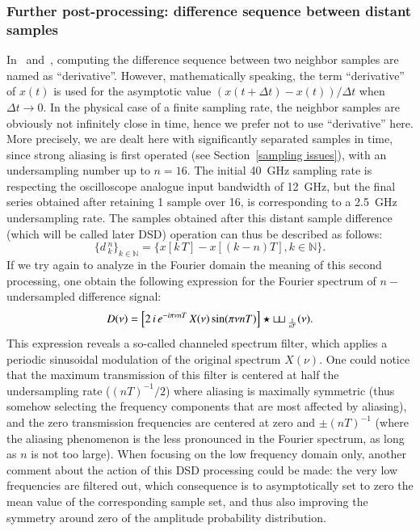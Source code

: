 \subsubsection{Further post-processing: difference sequence between
  distant samples}
\label{dsd}
%
In~\cite{ultrafast2009} and~\cite{ultrafast2010}, computing the
difference sequence between two neighbor samples are named as
``derivative''. However, mathematically speaking, the term
``derivative'' of $x(t)$ is used for the asymptotic value $(
x(t+\Delta t)-x(t) )/ \Delta t$ when $\Delta t\rightarrow 0$. In the
physical case of a finite sampling rate, the neighbor samples are
obviously not infinitely close in time, hence we prefer not to use
``derivative'' here. More precisely, we are dealt here with
significantly separated samples in time, since strong aliasing is
first operated (see Section~\ref{sampling issues}), with an
undersampling number up to $n=16$. The initial 40~GHz sampling rate is
respecting the oscilloscope analogue input bandwidth of 12~GHz, but
the final series obtained after retaining 1 sample over 16, is
corresponding to a 2.5~GHz undersampling rate. The samples obtained
after this distant sample difference (which will be called later DSD)
operation can thus be described as follows:
%
\begin{equation}
  \label{eq:diff_samples}
  \{d\,_k^n\}_{k\in\mathbb{N}} = \{x[k\,T]-x[(k-n)T],
  k\in\mathbb{N}\}.
\end{equation}
%
If we try again to analyze in the Fourier domain the meaning of this
second processing, one obtain the following expression for the Fourier
spectrum of $n-$ undersampled difference signal:
%
\begin{equation}
  \label{eq:n-diff_spectrum}
  D(\nu) = \left[2\,i\,e^{-i\pi\nu nT}\, X(\nu)\sin(\pi\nu
    nT)\right] \star{\sqcup\!\sqcup}\,_\frac{1}{nT}(\nu).
\end{equation}
%
This expression reveals a so-called channeled spectrum filter, which
applies a periodic sinusoidal modulation of the original spectrum
$X(\nu)$. One could notice that the maximum transmission of this
filter is centered at half the undersampling rate ($(nT)^{-1}/2$)
where aliasing is maximally symmetric (thus somehow selecting the
frequency components that are most affected by aliasing), and the zero
transmission frequencies are centered at zero and $\pm(nT)^{-1}$
(where the aliasing phenomenon is the less pronounced in the Fourier
spectrum, as long as $n$ is not too large). When focusing on the low
frequency domain only, another comment about the action of this DSD
processing could be made: the very low frequencies are filtered out,
which consequence is to asymptotically set to zero the mean value of
the corresponding sample set, and thus also improving the symmetry
around zero of the amplitude probability distribution.


